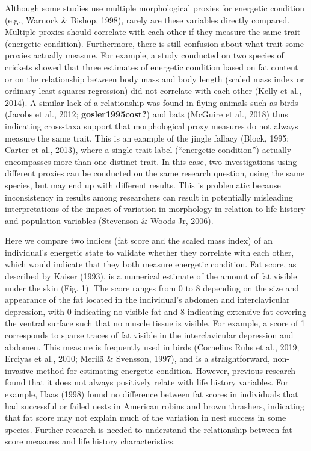 \documentclass[
]{article}
\begin{document}
Although some studies use multiple morphological proxies for energetic
condition (e.g., Warnock \& Bishop, 1998), rarely are these variables
directly compared. Multiple proxies should correlate with each other if
they measure the same trait (energetic condition). Furthermore, there is
still confusion about what trait some proxies actually measure. For
example, a study conducted on two species of crickets showed that three
estimates of energetic condition based on fat content or on the
relationship between body mass and body length (scaled mass index or
ordinary least squares regression) did not correlate with each other
(Kelly et al., 2014). A similar lack of a relationship was found in
flying animals such as birds (Jacobs et al., 2012;
\textbf{gosler1995cost?}) and bats (McGuire et al., 2018) thus
indicating cross-taxa support that morphological proxy measures do not
always measure the same trait. This is an example of the jingle fallacy
(Block, 1995; Carter et al., 2013), where a single trait label
(``energetic condition'') actually encompasses more than one distinct
trait. In this case, two investigations using different proxies can be
conducted on the same research question, using the same species, but may
end up with different results. This is problematic because inconsistency
in results among researchers can result in potentially misleading
interpretations of the impact of variation in morphology in relation to
life history and population variables (Stevenson \& Woods Jr, 2006).

Here we compare two indices (fat score and the scaled mass index) of an
individual's energetic state to validate whether they correlate with
each other, which would indicate that they both measure energetic
condition. Fat score, as described by Kaiser (1993), is a numerical
estimate of the amount of fat visible under the skin (Fig. 1). The score
ranges from 0 to 8 depending on the size and appearance of the fat
located in the individual's abdomen and interclavicular depression, with
0 indicating no visible fat and 8 indicating extensive fat covering the
ventral surface such that no muscle tissue is visible. For example, a
score of 1 corresponds to sparse traces of fat visible in the
interclavicular depression and abdomen. This measure is frequently used
in birds (Cornelius Ruhs et al., 2019; Erciyas et al., 2010; Merilä \&
Svensson, 1997), and is a straightforward, non-invasive method for
estimating energetic condition. However, previous research found that it
does not always positively relate with life history variables. For
example, Haas (1998) found no difference between fat scores in
individuals that had successful or failed nests in American robins and
brown thrashers, indicating that fat score may not explain much of the
variation in nest success in some species. Further research is needed to
understand the relationship between fat score measures and life history
characteristics.
\end{document}
